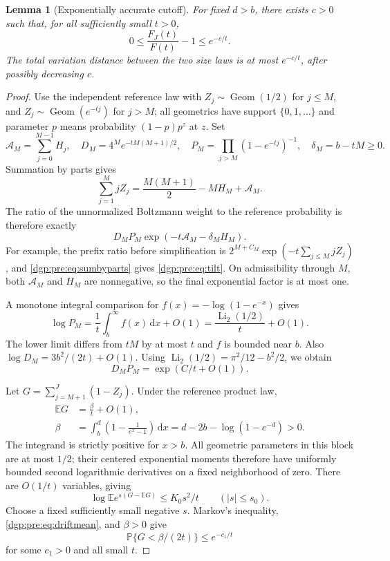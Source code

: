 \documentclass[11pt,letterpaper]{article}
\numberwithin{equation}{section}
\newtheorem{lemma}[theorem]{Lemma}
\theoremstyle{remark}\newtheorem{remark}[theorem]{Remark}
\newcommand{\PP}{\mathbb P}
\newcommand{\EE}{\mathbb E}
\newcommand{\dd}{\,\mathrm d}
\DeclareMathOperator{\Li}{Li}
\begin{document}
\begin{lemma}[Exponentially accurate cutoff]\label{dgp:pre:lem:cutoff}
For fixed $d>b$, there exists $c>0$ such that, for all sufficiently
small $t>0$,
\begin{equation}
 0\leq\frac{F_J(t)}{F(t)}-1\leq e^{-c/t}.
 \label{dgp:pre:eq:cutoff}
\end{equation}
The total variation distance between the two size laws is at most
$e^{-c/t}$, after possibly decreasing $c$.
\end{lemma}
\begin{proof}
Use the independent reference law with $Z_j\sim\operatorname{Geom}(1/2)$
for $j\leq M$, and $Z_j\sim\operatorname{Geom}(e^{-tj})$ for $j>M$;
all geometrics have support $\{0,1,\ldots\}$ and parameter $p$ means
probability $(1-p)p^z$ at $z$. Set
\[
 \mathcal A_M=\sum_{j=0}^{M-1}H_j,\quad
 D_M=4^M e^{-tM(M+1)/2},\quad
 P_M=\prod_{j>M}(1-e^{-tj})^{-1},\quad
 \delta_M=b-tM\geq0.
\]
Summation by parts gives
\begin{equation}
 \sum_{j=1}^M jZ_j=\frac{M(M+1)}2-MH_M+\mathcal A_M.
 \label{dgp:pre:eq:sumbyparts}
\end{equation}
The ratio of the unnormalized Boltzmann weight to the reference
probability is therefore exactly
\begin{equation}
 D_MP_M\exp(-t\mathcal A_M-\delta_MH_M).
 \label{dgp:pre:eq:tilt}
\end{equation}
For example, the prefix ratio before simplification is
$2^{M+C_M}\exp(-t\sum_{j\leq M}jZ_j)$, and \eqref{dgp:pre:eq:sumbyparts} gives
\eqref{dgp:pre:eq:tilt}. On admissibility through $M$, both $\mathcal A_M$ and
$H_M$ are nonnegative, so the final exponential factor is at most one.

A monotone integral comparison for
$f(x)=-\log(1-e^{-x})$ gives
\[
 \log P_M=\frac1t\int_b^\infty f(x)\dd x+O(1)
         =\frac{\Li_2(1/2)}t+O(1).
\]
The lower limit differs from $tM$ by at most $t$ and $f$ is bounded
near $b$. Also $\log D_M=3b^2/(2t)+O(1)$.
Using $\Li_2(1/2)=\pi^2/12-b^2/2$, we obtain
\begin{equation}
 D_MP_M=\exp(C/t+O(1)).
 \label{dgp:pre:eq:normalizer}
\end{equation}

Let $G=\sum_{j=M+1}^J(1-Z_j)$. Under the reference product law,
\begin{align}
 \EE G&=\frac\beta t+O(1),\label{dgp:pre:eq:driftmean}\\
 \beta&=\int_b^d\left(1-\frac1{e^x-1}\right)\dd x
       =d-2b-\log(1-e^{-d})>0.
 \label{dgp:pre:eq:beta}
\end{align}
The integrand is strictly positive for $x>b$. All geometric parameters
in this block are at most $1/2$; their centered exponential moments
therefore have uniformly bounded second logarithmic derivatives on
a fixed neighborhood of zero. There are $O(1/t)$ variables, giving
\[
 \log\EE e^{s(G-\EE G)}\leq K_0s^2/t\qquad(|s|\leq s_0).
\]
Choose a fixed sufficiently small negative $s$. Markov's inequality,
\eqref{dgp:pre:eq:driftmean}, and $\beta>0$ give
\begin{equation}
 \PP\{G<\beta/(2t)\}\leq e^{-c_1/t}
 \label{dgp:pre:eq:chernoff}
\end{equation}
for some $c_1>0$ and all small $t$.


\end{proof}
\end{document}
